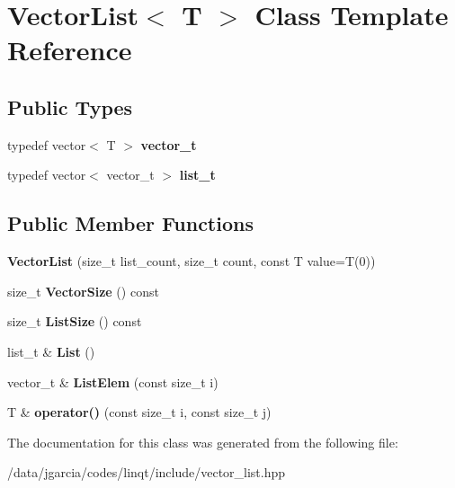 \hypertarget{class_vector_list}{}\section{Vector\+List$<$ T $>$ Class Template Reference}
\label{class_vector_list}
\subsection*{Public Types}
\begin{DoxyCompactItemize}
\item 
typedef vector$<$ T $>$ {\bfseries vector\+\_\+t}\hypertarget{class_vector_list_a4ef3e8b689d699aff1ba43ebca715297}{}\label{class_vector_list_a4ef3e8b689d699aff1ba43ebca715297}

\item 
typedef vector$<$ vector\+\_\+t $>$ {\bfseries list\+\_\+t}\hypertarget{class_vector_list_ab5c30ed2bba0842a4ceac36c74d1bfe5}{}\label{class_vector_list_ab5c30ed2bba0842a4ceac36c74d1bfe5}

\end{DoxyCompactItemize}
\subsection*{Public Member Functions}
\begin{DoxyCompactItemize}
\item 
{\bfseries Vector\+List} (size\+\_\+t list\+\_\+count, size\+\_\+t count, const T value=T(0))\hypertarget{class_vector_list_a0837ae6e888fb3876c8fcb0ad8049e1c}{}\label{class_vector_list_a0837ae6e888fb3876c8fcb0ad8049e1c}

\item 
size\+\_\+t {\bfseries Vector\+Size} () const \hypertarget{class_vector_list_a2c6b87ee550f3b6114eb0df2a0897c35}{}\label{class_vector_list_a2c6b87ee550f3b6114eb0df2a0897c35}

\item 
size\+\_\+t {\bfseries List\+Size} () const \hypertarget{class_vector_list_a07e32900bf03659c8e047d2f9151795b}{}\label{class_vector_list_a07e32900bf03659c8e047d2f9151795b}

\item 
list\+\_\+t \& {\bfseries List} ()\hypertarget{class_vector_list_ad504acb2a162836ff421c45e36890f9b}{}\label{class_vector_list_ad504acb2a162836ff421c45e36890f9b}

\item 
vector\+\_\+t \& {\bfseries List\+Elem} (const size\+\_\+t i)\hypertarget{class_vector_list_a72945ca5e0745ede97c9f3193492f908}{}\label{class_vector_list_a72945ca5e0745ede97c9f3193492f908}

\item 
T \& {\bfseries operator()} (const size\+\_\+t i, const size\+\_\+t j)\hypertarget{class_vector_list_a02ed6a307417d9fcb40d1402922058f2}{}\label{class_vector_list_a02ed6a307417d9fcb40d1402922058f2}

\end{DoxyCompactItemize}


The documentation for this class was generated from the following file\+:\begin{DoxyCompactItemize}
\item 
/data/jgarcia/codes/linqt/include/vector\+\_\+list.\+hpp\end{DoxyCompactItemize}
